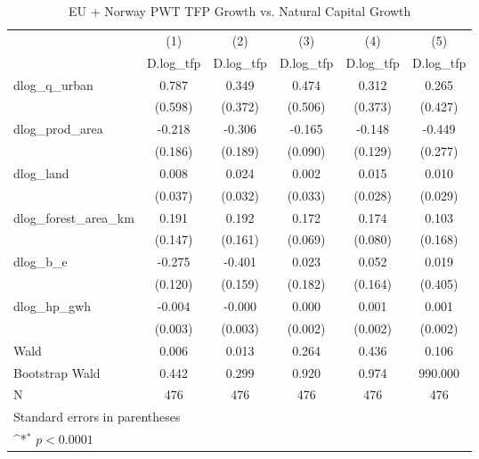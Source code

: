 \begin{table}[htbp]\centering
\def\sym#1{\ifmmode^{#1}\else\(^{#1}\)\fi}
\caption{EU + Norway PWT TFP Growth vs. Natural Capital Growth}
\begin{tabular}{l*{5}{c}}
\hline\hline
            &\multicolumn{1}{c}{(1)}&\multicolumn{1}{c}{(2)}&\multicolumn{1}{c}{(3)}&\multicolumn{1}{c}{(4)}&\multicolumn{1}{c}{(5)}\\
            &\multicolumn{1}{c}{D.log\_tfp}&\multicolumn{1}{c}{D.log\_tfp}&\multicolumn{1}{c}{D.log\_tfp}&\multicolumn{1}{c}{D.log\_tfp}&\multicolumn{1}{c}{D.log\_tfp}\\
\hline
dlog\_q\_urban&       0.787       &       0.349       &       0.474       &       0.312       &       0.265       \\
            &     (0.598)       &     (0.372)       &     (0.506)       &     (0.373)       &     (0.427)       \\
[1em]
dlog\_prod\_area&      -0.218       &      -0.306       &      -0.165       &      -0.148       &      -0.449       \\
            &     (0.186)       &     (0.189)       &     (0.090)       &     (0.129)       &     (0.277)       \\
[1em]
dlog\_land   &       0.008       &       0.024       &       0.002       &       0.015       &       0.010       \\
            &     (0.037)       &     (0.032)       &     (0.033)       &     (0.028)       &     (0.029)       \\
[1em]
dlog\_forest\_area\_km&       0.191       &       0.192       &       0.172       &       0.174       &       0.103       \\
            &     (0.147)       &     (0.161)       &     (0.069)       &     (0.080)       &     (0.168)       \\
[1em]
dlog\_b\_e    &      -0.275       &      -0.401       &       0.023       &       0.052       &       0.019       \\
            &     (0.120)       &     (0.159)       &     (0.182)       &     (0.164)       &     (0.405)       \\
[1em]
dlog\_hp\_gwh &      -0.004       &      -0.000       &       0.000       &       0.001       &       0.001       \\
            &     (0.003)       &     (0.003)       &     (0.002)       &     (0.002)       &     (0.002)       \\
\hline
Wald        &       0.006       &       0.013       &       0.264       &       0.436       &       0.106       \\
Bootstrap Wald&       0.442       &       0.299       &       0.920       &       0.974       &     990.000       \\
N           &         476       &         476       &         476       &         476       &         476       \\
\hline\hline
\multicolumn{6}{l}{\footnotesize Standard errors in parentheses}\\
\multicolumn{6}{l}{\footnotesize \sym{*} \(p<0.0001\)}\\
\end{tabular}
\end{table}
